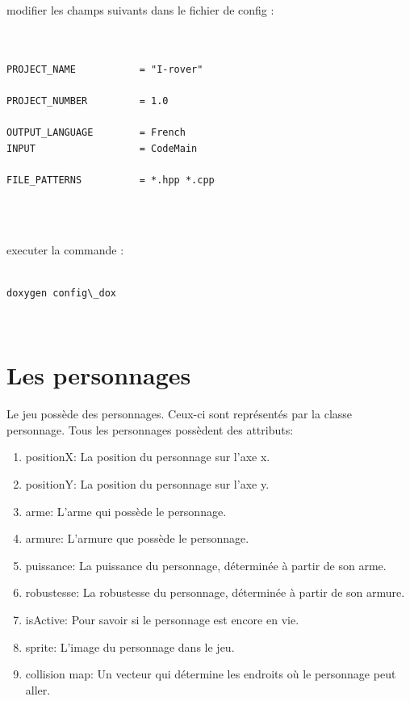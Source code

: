 \documentclass[a4paper,12pts]{article}
\newenvironment{DDbox}[1]{
\begin{lrbox}{\BBbox}\begin{minipage}{\linewidth}}
{\end{minipage}\end{lrbox}\noindent\colorbox{Zgris}{\usebox{\BBbox}} \\
[.5cm]}
\begin{document}
modifier les champs suivants dans le fichier de config :

\vspace{0.3 cm}


\begin{DDbox}{\linewidth}
\begin{verbatim}


PROJECT_NAME           = "I-rover"

PROJECT_NUMBER         = 1.0

OUTPUT_LANGUAGE        = French
INPUT                  = CodeMain

FILE_PATTERNS          = *.hpp *.cpp


\end{verbatim}
\end{DDbox}


executer la commande :

\vspace{0.3 cm}

\begin{DDbox}{\linewidth}
\begin{verbatim}

doxygen config\_dox
\end{verbatim}
\end{DDbox}
\vspace{0.3 cm}

\newpage
\section{Les personnages}
Le jeu possède des personnages. Ceux-ci sont représentés par la classe personnage. Tous les personnages possèdent des attributs:
\begin{enumerate}
	\item positionX: La position du personnage sur l'axe x.
	\item positionY: La position du personnage sur l'axe y.
	\item arme: L'arme qui possède le personnage.
	\item armure: L'armure que possède le personnage.
	\item puissance: La puissance du personnage, déterminée à partir de son arme.
	\item robustesse: La robustesse du personnage, déterminée à partir de son armure.
	\item isActive: Pour savoir si le personnage est encore en vie.
	\item sprite: L'image du personnage dans le jeu.
	\item collision map: Un vecteur qui détermine les endroits où le personnage peut aller.
\end{enumerate}
\end{document}
